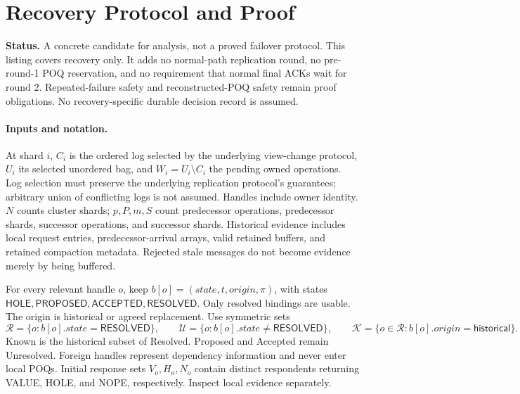 \section{Recovery Protocol and Proof}

\providecommand{\Hole}{\mathsf{HOLE}}
\providecommand{\Proposed}{\mathsf{PROPOSED}}
\providecommand{\Accepted}{\mathsf{ACCEPTED}}
\providecommand{\Resolved}{\mathsf{RESOLVED}}
\providecommand{\Historical}{\mathsf{historical}}
\providecommand{\Replacement}{\mathsf{replacement}}
\providecommand{\Recovering}{\mathsf{recovering}}
\providecommand{\Normal}{\mathsf{normal}}
\providecommand{\owner}{\mathsf{owner}}
\providecommand{\arr}{\mathit{arrivalTS}}
\providecommand{\fin}{\mathit{finalTS}}
\providecommand{\lready}{\mathit{lastReadyTS}}

\noindent\textbf{Status.} A concrete candidate for analysis, not a proved
failover protocol. This listing covers recovery only. It adds no normal-path
replication round, no pre-round-1 POQ reservation, and no requirement that normal
final ACKs wait for round 2. Repeated-failure safety and reconstructed-POQ safety
remain proof obligations. No recovery-specific durable decision record is assumed.

\paragraph{Inputs and notation.}
At shard $i$, $C_i$ is the ordered log selected by the underlying view-change
protocol, $U_i$ its selected unordered bag, and $W_i=U_i\setminus C_i$ the pending
owned operations. Log selection must preserve the underlying replication
protocol's guarantees; arbitrary union of conflicting logs is not assumed.
Handles include owner identity. $N$ counts cluster shards; $p,P,m,S$ count
predecessor operations, predecessor shards, successor operations, and successor
shards. Historical evidence includes local request entries, predecessor-arrival
arrays, valid retained buffers, and retained compaction metadata. Rejected stale
messages do not become evidence merely by being buffered.

For every relevant handle $o$, keep $b[o]=(state,t,origin,\pi)$, with states
$\Hole,\Proposed,\Accepted,\Resolved$. Only resolved bindings are usable.
The origin is historical or agreed replacement. Use symmetric sets
\[
 \mathcal R=\{o:b[o].state=\Resolved\},\qquad
 \mathcal U=\{o:b[o].state\ne\Resolved\},\qquad
 \mathcal K=\{o\in\mathcal R:b[o].origin=\Historical\}.
\]
Known is the historical subset of Resolved. Proposed and Accepted remain
Unresolved. Foreign handles represent dependency information and never enter
local POQs. Initial response sets $V_o,H_o,N_o$ contain distinct respondents
returning VALUE, HOLE, and NOPE, respectively. Inspect local evidence separately.

